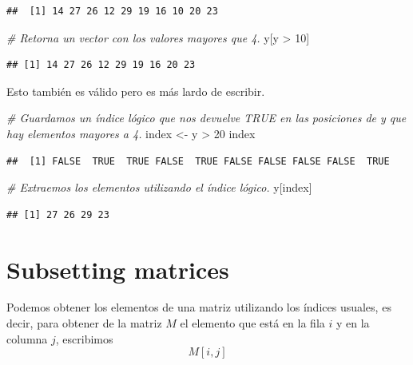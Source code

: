 \documentclass[
  12pt,
]{book}
\newenvironment{Shaded}{\begin{snugshade}}{\end{snugshade}}
\newcommand{\CommentTok}[1]{\textcolor[rgb]{0.56,0.35,0.01}{\textit{#1}}}
\newcommand{\DecValTok}[1]{\textcolor[rgb]{0.00,0.00,0.81}{#1}}
\newcommand{\NormalTok}[1]{#1}
\newcommand{\OtherTok}[1]{\textcolor[rgb]{0.56,0.35,0.01}{#1}}
\newcommand{\SpecialCharTok}[1]{\textcolor[rgb]{0.00,0.00,0.00}{#1}}
\begin{document}
\begin{verbatim}
##  [1] 14 27 26 12 29 19 16 10 20 23
\end{verbatim}

\begin{Shaded}
\begin{Highlighting}[]
\CommentTok{\# Retorna un vector con los valores mayores que 4.}
\NormalTok{y[y }\SpecialCharTok{\textgreater{}} \DecValTok{10}\NormalTok{]}
\end{Highlighting}
\end{Shaded}

\begin{verbatim}
## [1] 14 27 26 12 29 19 16 20 23
\end{verbatim}

Esto también es válido pero es más lardo de escribir.

\begin{Shaded}
\begin{Highlighting}[]
\CommentTok{\# Guardamos un índice lógico que nos devuelve TRUE en las posiciones de y que hay elementos mayores a 4.}
\NormalTok{index }\OtherTok{\textless{}{-}}\NormalTok{ y }\SpecialCharTok{\textgreater{}} \DecValTok{20}
\NormalTok{index}
\end{Highlighting}
\end{Shaded}

\begin{verbatim}
##  [1] FALSE  TRUE  TRUE FALSE  TRUE FALSE FALSE FALSE FALSE  TRUE
\end{verbatim}

\begin{Shaded}
\begin{Highlighting}[]
\CommentTok{\# Extraemos los elementos utilizando el índice lógico.}
\NormalTok{y[index]}
\end{Highlighting}
\end{Shaded}

\begin{verbatim}
## [1] 27 26 29 23
\end{verbatim}

\hypertarget{subsetting-matrices}{%
\section{\texorpdfstring{\textbf{Subsetting matrices}}{Subsetting matrices}}\label{subsetting-matrices}}

Podemos obtener los elementos de una matriz utilizando los índices usuales, es decir, para obtener de la matriz \(M\) el elemento que está en la fila \(i\) y en la columna \(j\), escribimos
\[
M[i,j]
\]
\end{document}
